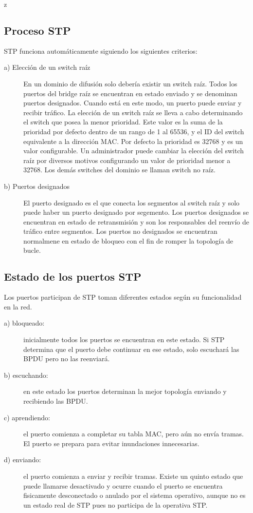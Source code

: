z\documentclass[12pt]{article}
\begin{document}
\subsection{Proceso STP}
STP funciona automáticamente siguiendo los siguientes criterios:
\begin{description}
\item [a) Elección de un switch raíz] En un dominio de difusión solo debería existir un switch raíz. Todos los puertos del bridge raíz se encuentran en estado enviado y se denominan puertos designados. Cuando está en este modo, un puerto puede enviar y recibir tráfico. La elección de un switch raíz se lleva a cabo determinando el switch que posea la menor prioridad. Este valor es la suma de la prioridad por defecto dentro de un rango de 1 al 65536, y el ID del switch equivalente a la dirección MAC. Por defecto la prioridad es 32768 y es un valor configurable. Un administrador puede cambiar la elección del switch raíz por diversos motivos configurando un valor de prioridad menor a 32768. Los demás switches del dominio se llaman switch no raíz.

\item [b) Puertos designados] El puerto designado es el que conecta los segmentos al switch raíz y solo puede haber un puerto designado por segemento. Los puertos designados se encuentran en estado de retransmisión y son los responsables del reenvío de tráfico entre segmentos. Los puertos no designados se encuentran normalmene en estado de bloqueo con el fin de romper la topología de bucle. 
\end{description}

\subsection{Estado de los puertos STP}
Los puertos participan de STP toman diferentes estados según su funcionalidad en la red.
\begin{description}
\item[a) bloqueado:]  inicialmente todos los puertos se encuentran en este estado. Si STP determina que el puerto debe continuar en ese estado, solo escuchará las BPDU pero no las reenviará.
\item[b) escuchando:] en este estado los puertos determinan la mejor topología enviando y recibiendo las BPDU.
\item[c) aprendiendo:] el puerto comienza a completar su tabla MAC, pero aún no envía tramas. El puerto se prepara para evitar inundaciones innecesarias.
\item[d) enviando:]el puerto comienza a enviar y recibir tramas.
Existe un quinto estado que puede llamarse desactivado y ocurre cuando el puerto se encuentra fisicamente desconectado o anulado por el sistema operativo, aunque no es un estado real de STP pues no participa de la operativa STP.
\end{description}
\end{document}
